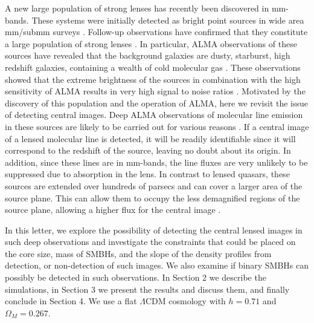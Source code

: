 \documentclass[chicago]{emulateapj}
\begin{document}
A new large population of strong lenses has recently been discovered in mm-bands. These systems were initially detected as bright point sources in wide area mm/submm surveys \citep{vieira:10,negrello:10}. Follow-up observations have confirmed that they constitute a large population of strong lenses \citep{vieira:13, hezaveh:13b, bussmann:13}.
In particular, ALMA observations of these sources have revealed that the background galaxies are dusty, starburst, high redshift galaxies, containing a wealth of cold molecular gas \citep{Weiss:13}.  These observations showed that the extreme brightness of the sources in combination with the high sensitivity of ALMA results in very high signal to noise ratios \citep[e.g. the lens models in][were based on just $\sim50$ second long observations]{hezaveh:13b}.
Motivated by the discovery of this population and the operation of ALMA, here we revisit the issue of detecting central images.
Deep ALMA observations of molecular line emission in these sources are likely to be carried out for various reasons \citep[e.g.,][]{hezaveh:14a,hezaveh:14b}. If a central image of a lensed molecular line is detected, it will be readily identifiable since it will correspond to the redshift of the source, leaving no doubt about its origin. In addition, since these lines are in mm-bands, the line fluxes are very unlikely to be suppressed due to absorption in the lens. 
In contrast to lensed quasars, these sources are extended over hundreds of parsecs and can cover a larger area of the source plane. This can allow them to occupy the less demagnified regions of the source plane, allowing a higher flux for the central image \citep[the opposite effect of magnification damping due to extended sources,, see e.g.][]{hezaveh:11}.

 In this letter, we explore the possibility of detecting the central lensed images in such deep observations and investigate the constraints that could be placed on the core size, mass of SMBHs, and the slope of the density profiles from detection, or non-detection of such images. We also examine if binary SMBHs can possibly be detected in such observations. 
 In Section 2 we describe the simulations, in Section 3 we present the results and discuss them, and finally conclude in Section 4. We use a flat $\Lambda$CDM cosmology with $h=0.71$ and $\Omega_M=0.267$.
 
\end{document}
